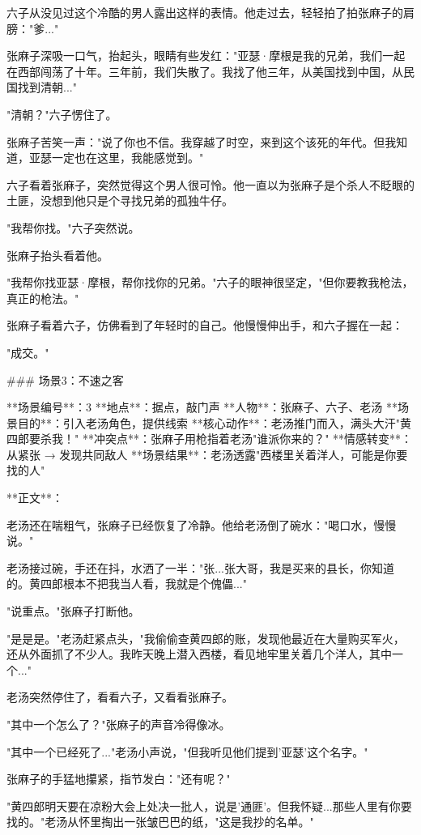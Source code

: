 六子从没见过这个冷酷的男人露出这样的表情。他走过去，轻轻拍了拍张麻子的肩膀："爹..."

张麻子深吸一口气，抬起头，眼睛有些发红："亚瑟·摩根是我的兄弟，我们一起在西部闯荡了十年。三年前，我们失散了。我找了他三年，从美国找到中国，从民国找到清朝..."

"清朝？"六子愣住了。

张麻子苦笑一声："说了你也不信。我穿越了时空，来到这个该死的年代。但我知道，亚瑟一定也在这里，我能感觉到。"

六子看着张麻子，突然觉得这个男人很可怜。他一直以为张麻子是个杀人不眨眼的土匪，没想到他只是个寻找兄弟的孤独牛仔。

"我帮你找。"六子突然说。

张麻子抬头看着他。

"我帮你找亚瑟·摩根，帮你找你的兄弟。"六子的眼神很坚定，"但你要教我枪法，真正的枪法。"

张麻子看着六子，仿佛看到了年轻时的自己。他慢慢伸出手，和六子握在一起：

"成交。"

### 场景3：不速之客

**场景编号**：3  
**地点**：据点，敲门声  
**人物**：张麻子、六子、老汤  
**场景目的**：引入老汤角色，提供线索  
**核心动作**：老汤推门而入，满头大汗"黄四郎要杀我！"  
**冲突点**：张麻子用枪指着老汤"谁派你来的？"  
**情感转变**：从紧张 → 发现共同敌人  
**场景结果**：老汤透露"西楼里关着洋人，可能是你要找的人"

**正文**：

老汤还在喘粗气，张麻子已经恢复了冷静。他给老汤倒了碗水："喝口水，慢慢说。"

老汤接过碗，手还在抖，水洒了一半："张...张大哥，我是买来的县长，你知道的。黄四郎根本不把我当人看，我就是个傀儡..."

"说重点。"张麻子打断他。

"是是是。"老汤赶紧点头，"我偷偷查黄四郎的账，发现他最近在大量购买军火，还从外面抓了不少人。我昨天晚上潜入西楼，看见地牢里关着几个洋人，其中一个..."

老汤突然停住了，看看六子，又看看张麻子。

"其中一个怎么了？"张麻子的声音冷得像冰。

"其中一个已经死了..."老汤小声说，"但我听见他们提到'亚瑟'这个名字。"

张麻子的手猛地攥紧，指节发白："还有呢？"

"黄四郎明天要在凉粉大会上处决一批人，说是'通匪'。但我怀疑...那些人里有你要找的。"老汤从怀里掏出一张皱巴巴的纸，"这是我抄的名单。"

